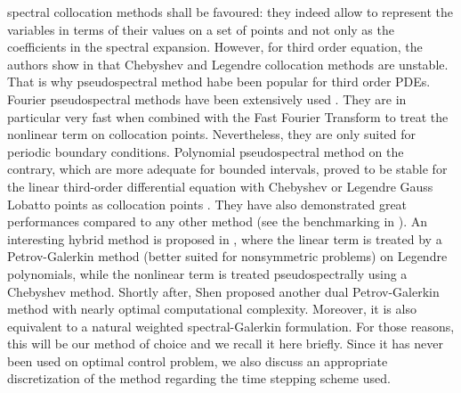 spectral collocation methods shall be favoured: they indeed allow to represent the variables in terms of their values on a set of points and not only as the coefficients in the spectral expansion. However, for third order equation, the authors show in \cite{merryfield1993properties} that Chebyshev and Legendre collocation methods are unstable. That is why pseudospectral method habe been popular for third order PDEs. Fourier pseudospectral methods have been extensively used \cite{trefethen2000spectral,maday1988error,fornberg1978numerical}. They are in particular very fast when combined with the Fast Fourier Transform to treat the nonlinear term on collocation points. Nevertheless, they are only suited for periodic boundary conditions. Polynomial pseudospectral method on the contrary, which are more adequate for bounded intervals, proved to be stable for the linear third-order differential equation with Chebyshev or Legendre Gauss Lobatto points as collocation points \cite{HuangSloan1992}. They have also demonstrated great performances compared to any other method (see the benchmarking in \cite{skogestad2009boundary}). An interesting hybrid method is proposed in \cite{ma2000legendre}, where the linear term is treated by a Petrov-Galerkin method (better suited for nonsymmetric problems) on Legendre polynomials, while the nonlinear term is treated pseudospectrally using a Chebyshev method. Shortly after, Shen \cite{shen2003new} proposed another dual Petrov-Galerkin method with nearly optimal computational complexity. Moreover, it is also equivalent to a natural weighted spectral-Galerkin formulation. For those reasons, this will be our method of choice and we recall it here briefly. Since it has never been used on optimal control problem, we also discuss an appropriate discretization of the method regarding the time stepping scheme used.

